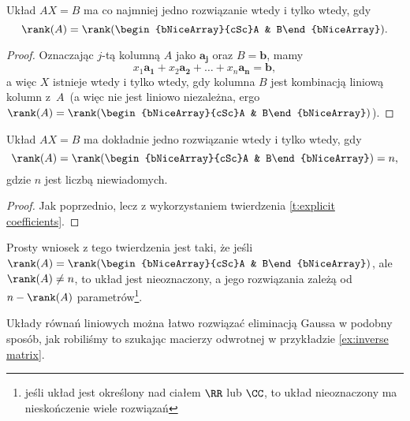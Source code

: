 \begin{theorem}
    \label{t:Kronecker-Cappelli}
    Układ $AX = B$ ma co najmniej jedno rozwiązanie wtedy i tylko wtedy, gdy
    \[ \rank(A) = \rank(\begin{bNiceArray}{cSc}A & B\end{bNiceArray}). \]
\end{theorem}
\begin{proof}
    Oznaczając $j$-tą kolumną $A$ jako $\mathbf{a_j}$ oraz $B = \mathbf{b}$, mamy
    \[ x_1\mathbf{a_1} + x_2\mathbf{a_2} + \ldots + x_n\mathbf{a_n} = \mathbf{b}, \]
    a więc $X$ istnieje wtedy i tylko wtedy, gdy kolumna $B$ jest kombinacją liniową kolumn z~$A$~(a więc nie jest liniowo niezależna, ergo $\rank(A) = \rank(\begin{bNiceArray}{cSc}A & B\end{bNiceArray})$).
\end{proof}

\begin{theorem}
    \label{t:rankA = rankA|B = n}
    Układ $AX = B$ ma dokładnie jedno rozwiązanie wtedy i tylko wtedy, gdy
    \[ \rank(A) = \rank(\begin{bNiceArray}{cSc}A & B\end{bNiceArray}) = n, \]
    gdzie $n$ jest liczbą niewiadomych.
\end{theorem}
\begin{proof}
    Jak poprzednio, lecz z wykorzystaniem twierdzenia \ref{t:explicit coefficients}.
\end{proof}

Prosty wniosek z tego twierdzenia jest taki, że jeśli $\rank(A) = \rank(\begin{bNiceArray}{cSc}A & B\end{bNiceArray})$, ale $\rank(A) \neq n$, to układ jest nieoznaczony, a jego rozwiązania zależą od $n - \rank(A)$ parametrów\footnote{jeśli układ jest określony nad ciałem $\RR$ lub $\CC$, to układ nieoznaczony ma nieskończenie wiele rozwiązań}.

Układy równań liniowych można łatwo rozwiązać eliminacją Gaussa w podobny sposób, jak robiliśmy to szukając macierzy odwrotnej w przykładzie \ref{ex:inverse matrix}.

